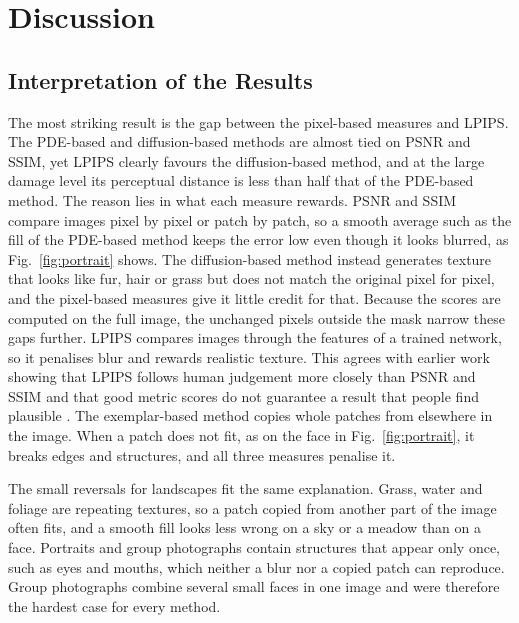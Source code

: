 \documentclass[conference]{IEEEtran}
\begin{document}
\section{Discussion}
\label{sec:discussion}

\subsection*{Interpretation of the Results}

The most striking result is the gap between the pixel-based measures and LPIPS. The PDE-based and diffusion-based methods are almost tied on PSNR and SSIM, yet LPIPS clearly favours the diffusion-based method, and at the large damage level its perceptual distance is less than half that of the PDE-based method. The reason lies in what each measure rewards. PSNR and SSIM compare images pixel by pixel or patch by patch, so a smooth average such as the fill of the PDE-based method keeps the error low even though it looks blurred, as Fig.~\ref{fig:portrait} shows. The diffusion-based method instead generates texture that looks like fur, hair or grass but does not match the original pixel for pixel, and the pixel-based measures give it little credit for that. Because the scores are computed on the full image, the unchanged pixels outside the mask narrow these gaps further. LPIPS compares images through the features of a trained network, so it penalises blur and rewards realistic texture. This agrees with earlier work showing that LPIPS follows human judgement more closely than PSNR and SSIM \cite{yang2024} and that good metric scores do not guarantee a result that people find plausible \cite{han2026diffumural}. The exemplar-based method copies whole patches from elsewhere in the image. When a patch does not fit, as on the face in Fig.~\ref{fig:portrait}, it breaks edges and structures, and all three measures penalise it.

The small reversals for landscapes fit the same explanation. Grass, water and foliage are repeating textures, so a patch copied from another part of the image often fits, and a smooth fill looks less wrong on a sky or a meadow than on a face. Portraits and group photographs contain structures that appear only once, such as eyes and mouths, which neither a blur nor a copied patch can reproduce. Group photographs combine several small faces in one image and were therefore the hardest case for every method.
\end{document}
